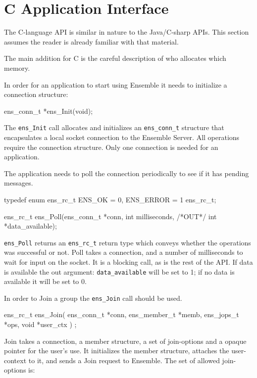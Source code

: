 \section{C Application Interface}
The C-language API is similar in nature to the Java/C-sharp APIs. This
section assumes the reader is already familiar with that material. 

The main addition for C is the careful description of who allocates
which memory. 

In order for an application to start using Ensemble it needs to
initialize a connection structure:
\begin{codebox}
ens_conn_t *ens_Init(void);
\end{codebox}

The {\tt ens\_Init} call allocates and initializes an {\tt ens\_conn\_t}
structure that encapsulates a local socket connection to the Ensemble
Server. All operations require the connection structure. Only one
connection is needed for an application. 

The application needs to poll the connection periodically to see if it
has pending messages. 

\begin{codebox}
typedef enum ens_rc_t {
    ENS_OK = 0,        
    ENS_ERROR = 1
} ens_rc_t;

ens_rc_t ens_Poll(ens_conn_t *conn, int milliseconds, /*OUT*/ int *data_available);
\end{codebox}

{\tt ens\_Poll} returns an {\tt ens\_rc\_t} return type which conveys
whether the operations was successful or not. Poll takes a connection,
and a number of milliseconds to wait for input on the socket. It is a
blocking call, as is the rest of the API. If data is available the out
argument: {\tt data\_available} will be set to 1; if no data is
available it will be set to 0. 

In order to Join a group the {\tt ens\_Join} call should be used. 
\begin{codebox}
ens_rc_t ens_Join(
    ens_conn_t *conn,
    ens_member_t *memb,
    ens_jops_t *ops,
    void *user_ctx
    ) ;
\end{codebox}

Join takes a connection, a member structure, a set of join-options and
a opaque pointer for the user's use. It initializes the member
structure, attaches the user-context to it, and sends a Join request
to Ensemble. The set of allowed join-options is: 

